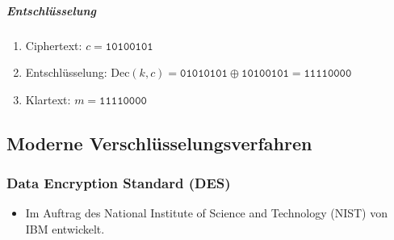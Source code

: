 \documentclass[a4paper, 11pt, accentcolor = tud3b]{tudreport}
\newcommand{\Dec}{\ensuremath{\textrm{Dec}}}
\begin{document}
						\subparagraph{Entschlüsselung}
							\begin{enumerate}
								\item[] Ciphertext: \( c = \texttt{10100101} \)
								\item Entschlüsselung: \( \Dec(k, c) = \texttt{01010101} \oplus \texttt{10100101} = \texttt{11110000} \)
								\item[] Klartext: \( m = \texttt{11110000} \)
							\end{enumerate}

            \subsection{Moderne Verschlüsselungsverfahren}
                \subsubsection{Data Encryption Standard (DES)}
                    \begin{itemize}
                    	\item Im Auftrag des National Institute of Science and Technology (NIST) von IBM entwickelt.
                    \end{itemize}
\end{document}
